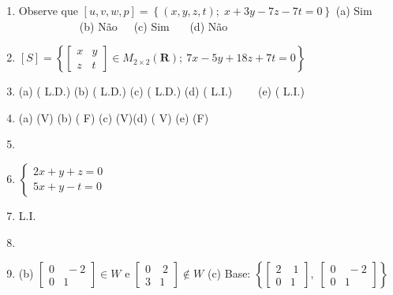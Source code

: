 \documentclass{report}
\begin{document}
\begin{enumerate}
\item  Observe que $\left[ u,v,w,p\right] =\left\{ \left( x,y,z,t\right)
;\;x+3y-7z-7t=0\right\} $\newline
(a) Sim$\qquad \qquad $\ \ \ (b) N\~{a}o\ \ \qquad \qquad \ (c) Sim\ \qquad
\ \qquad \ (d) N\~{a}o

\item  $\left[ S\right] =\left\{ \left[
\begin{array}{rr}
x & y \\
z & t
\end{array}
\right] \in M_{2\times 2}\left( \mathbf{R}\right) ;\ 7x-5y+18z+7t=0\right\} $

\item  (a) ( L.D.) \qquad (b) ( L.D.) \qquad (c) ( L.D.) \qquad (d) ( L.I.) $%
\qquad $(e) ( L.I.)

\item  (a) (V) \qquad (b) ( F) \qquad (c) (V)\qquad (d) ( V) \qquad (e) (F)

\item

\item  $\left\{
\begin{array}{l}
2x+y+z=0 \\
5x+y-t=0
\end{array}
\right. $

\item  L.I.

\item

\item  (b) $\left[
\begin{array}{rr}
0 & \;-2 \\
0 & 1
\end{array}
\right] \in W$ e $\left[
\begin{array}{rr}
0 & \;2 \\
3 & 1
\end{array}
\right] \notin W$\newline
(c) Base: $\left\{ \left[
\begin{array}{rr}
2 & \;1 \\
0 & 1
\end{array}
\right] ,\;\left[
\begin{array}{rr}
0 & \;-2 \\
0 & 1
\end{array}
\right] \right\} $


\end{enumerate}
\end{document}

